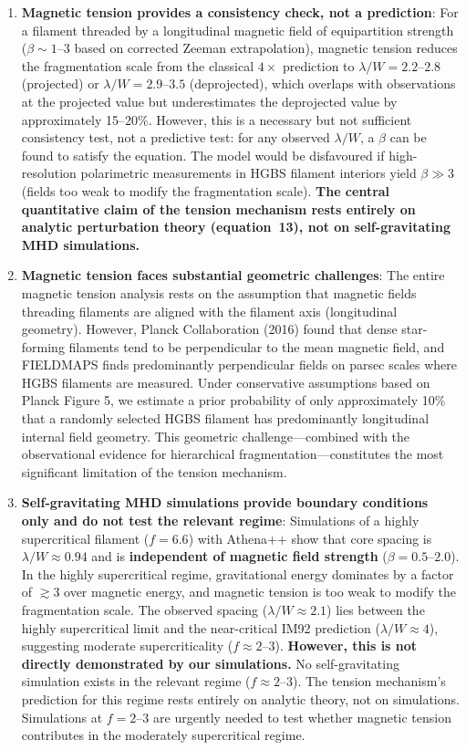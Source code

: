 \documentclass[11pt,a4paper]{article}
\begin{document}
\begin{enumerate}
    \item \textbf{Magnetic tension provides a consistency check, not a prediction}: For a filament threaded by a longitudinal magnetic field of equipartition strength ($\beta \sim 1$--$3$ based on corrected Zeeman extrapolation), magnetic tension reduces the fragmentation scale from the classical $4\times$ prediction to $\lambda/W = 2.2$--$2.8$ (projected) or $\lambda/W = 2.9$--$3.5$ (deprojected), which overlaps with observations at the projected value but underestimates the deprojected value by approximately 15--20\%. However, this is a necessary but not sufficient consistency test, not a predictive test: for any observed $\lambda/W$, a $\beta$ can be found to satisfy the equation. The model would be disfavoured if high-resolution polarimetric measurements in HGBS filament interiors yield $\beta \gg 3$ (fields too weak to modify the fragmentation scale). \textbf{The central quantitative claim of the tension mechanism rests entirely on analytic perturbation theory (equation~13), not on self-gravitating MHD simulations.}

    \item \textbf{Magnetic tension faces substantial geometric challenges}: The entire magnetic tension analysis rests on the assumption that magnetic fields threading filaments are aligned with the filament axis (longitudinal geometry). However, Planck Collaboration (2016) found that dense star-forming filaments tend to be perpendicular to the mean magnetic field, and FIELDMAPS finds predominantly perpendicular fields on parsec scales where HGBS filaments are measured. Under conservative assumptions based on Planck Figure 5, we estimate a prior probability of only approximately 10\% that a randomly selected HGBS filament has predominantly longitudinal internal field geometry. This geometric challenge—combined with the observational evidence for hierarchical fragmentation—constitutes the most significant limitation of the tension mechanism.

    \item \textbf{Self-gravitating MHD simulations provide boundary conditions only and do not test the relevant regime}: Simulations of a highly supercritical filament ($f = 6.6$) with Athena++ show that core spacing is $\lambda/W \approx 0.94$ and is \textbf{independent of magnetic field strength} ($\beta = 0.5$--$2.0$). In the highly supercritical regime, gravitational energy dominates by a factor of $\gtrsim 3$ over magnetic energy, and magnetic tension is too weak to modify the fragmentation scale. The observed spacing ($\lambda/W \approx 2.1$) lies between the highly supercritical limit and the near-critical IM92 prediction ($\lambda/W \approx 4$), suggesting moderate supercriticality ($f \approx 2$--$3$). \textbf{However, this is not directly demonstrated by our simulations.} No self-gravitating simulation exists in the relevant regime ($f \approx 2$--$3$). The tension mechanism's prediction for this regime rests entirely on analytic theory, not on simulations. Simulations at $f = 2$--$3$ are urgently needed to test whether magnetic tension contributes in the moderately supercritical regime.


\end{enumerate}
\end{document}
